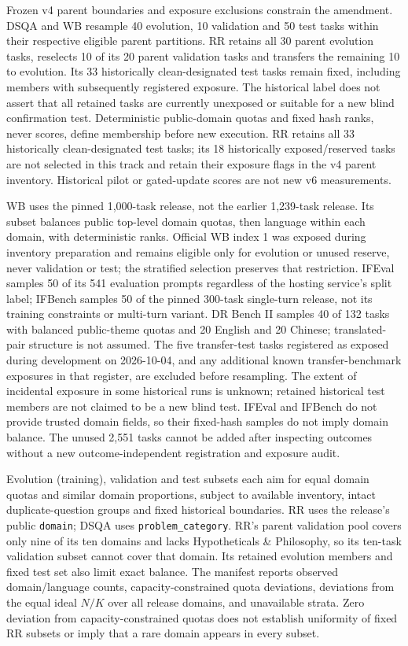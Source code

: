 Frozen v4 parent boundaries and exposure exclusions constrain the amendment.
DSQA and WB resample 40 evolution, 10 validation and 50 test tasks within
their respective eligible parent partitions. RR retains all 30 parent
evolution tasks, reselects 10 of its 20 parent validation tasks and transfers
the remaining 10 to evolution. Its 33 historically clean-designated test
tasks remain fixed, including members with subsequently registered exposure.
The historical label does not assert that all retained tasks are currently
unexposed or suitable for a new blind confirmation test.
Deterministic public-domain quotas and fixed hash ranks, never scores,
define membership before new execution. RR retains all 33 historically clean-designated
test tasks; its 18 historically exposed/reserved tasks are not selected
in this track and retain their exposure flags in the v4 parent inventory.
Historical pilot or gated-update scores are not new v6 measurements.

WB uses the pinned 1,000-task release, not the earlier 1,239-task release.
Its subset balances public top-level domain quotas, then language within
each domain, with deterministic ranks.
Official WB index 1 was exposed during inventory preparation and remains
eligible only for evolution or unused reserve, never validation or test;
the stratified selection preserves that restriction. IFEval samples 50 of its 541
evaluation prompts regardless of the hosting service's split label;
IFBench samples 50 of the pinned 300-task single-turn release, not its
training constraints or multi-turn variant. DR Bench II samples 40 of 132
tasks with balanced public-theme quotas and 20 English and 20 Chinese;
translated-pair structure is not assumed. The five transfer-test tasks
registered as exposed during development on 2026-10-04, and any additional
known transfer-benchmark exposures in that register, are excluded before resampling.
The extent of incidental exposure in some historical runs is unknown;
retained historical test members are not claimed to be a new blind test.
IFEval and IFBench do not provide trusted domain fields, so
their fixed-hash samples do not imply domain balance.
The unused 2,551 tasks cannot be added after inspecting outcomes
without a new outcome-independent registration and exposure audit.

Evolution (training), validation and test subsets each aim for equal domain
quotas and similar domain proportions, subject to available inventory,
intact duplicate-question groups and fixed historical boundaries. RR uses
the release's public \texttt{domain}; DSQA uses \texttt{problem\_category}.
RR's parent validation pool covers only nine of its ten domains and lacks
Hypotheticals \& Philosophy, so its ten-task validation subset cannot
cover that domain. Its retained evolution members and fixed test set also
limit exact balance. The manifest reports observed domain/language counts,
capacity-constrained quota deviations, deviations from the equal ideal
$N/K$ over all release domains, and unavailable strata. Zero deviation from
capacity-constrained quotas does not establish uniformity of fixed RR
subsets or imply that a rare domain appears in every subset.

